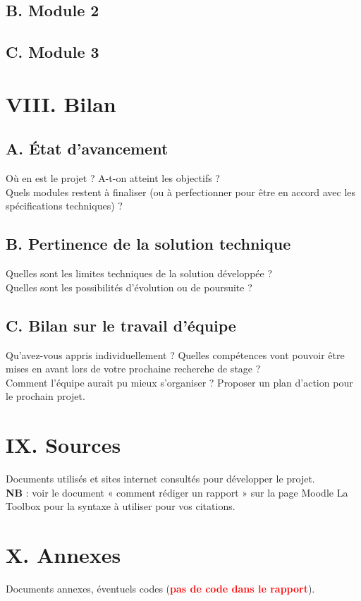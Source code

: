 \documentclass[a4paper,11pt]{book}
\begin{document}
\subsection*{B. Module 2}
\subsection*{C. Module 3}

\newpage
\section*{VIII. Bilan}
\subsection*{A. État d'avancement}
Où en est le projet ? A-t-on atteint les objectifs ?\\
\noindent Quels modules restent à finaliser (ou à perfectionner pour être en accord avec les spécifications techniques) ?

\subsection*{B. Pertinence de la solution technique}
Quelles sont les limites techniques de la solution développée ? \\
\noindent Quelles sont les possibilités d’évolution ou de poursuite ?


\subsection*{C. Bilan sur le travail d'équipe}
Qu’avez-vous appris individuellement ? Quelles compétences vont pouvoir être mises en avant lors de votre prochaine recherche de stage ?
\\
\noindent Comment l’équipe aurait pu mieux s’organiser ? Proposer un plan d’action pour le prochain projet.



\newpage
\section*{IX. Sources}
Documents utilisés et sites internet consultés pour développer le projet.\\
\noindent \textbf{NB} : voir le document « comment rédiger un rapport » sur la page Moodle La Toolbox pour la syntaxe à utiliser pour vos citations.



\newpage
\section*{X. Annexes}
Documents annexes, éventuels codes (\textbf{\textcolor{red}{pas de code dans le rapport}}).
\end{document}
